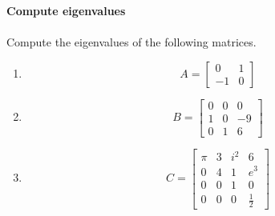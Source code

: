 \textbf{\normalsize Compute eigenvalues}\\
~\\
Compute the eigenvalues of the following matrices.
\begin{enumerate}
	\item $$
	A = \begin{bmatrix}
	0&1\\
	-1&0
	\end{bmatrix}
	$$
		\item
	$$
	B = \begin{bmatrix}
	0&0&0\\
	1&0&-9\\
	0&1&6
	\end{bmatrix}
	$$
\item $$
	C = \begin{bmatrix}
		\pi& 3& i^2& 6\\
		 0 & 4& 1  & e^3\\
		 0 & 0& 1  & 0\\
		 0 & 0& 0  & \frac{1}{2}
		\end{bmatrix}
	$$


\end{enumerate}
 